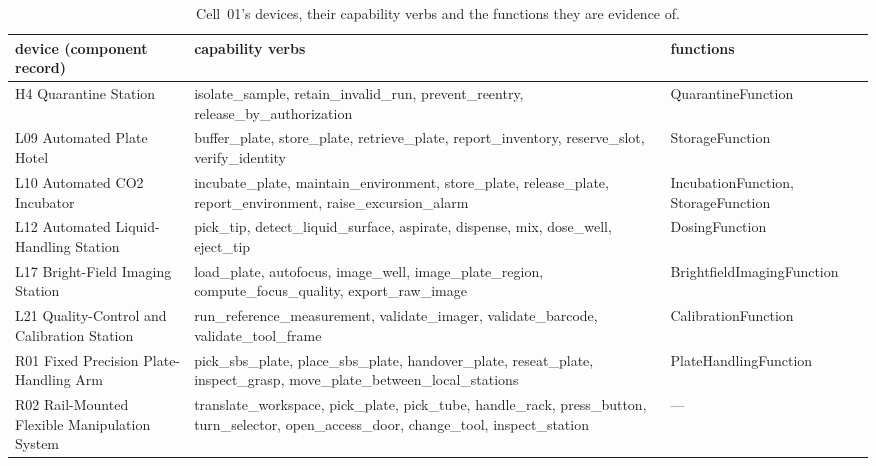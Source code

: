 \documentclass[10pt,a4paper]{article}
\begin{document}
\begin{table}[tbp]\centering\footnotesize
\caption{Cell~01's devices, their capability verbs and the functions they are evidence of.}\label{tab:c01dev}
\begin{tabularx}{\linewidth}{@{}>{\raggedright\arraybackslash}p{4.0cm}>{\raggedright\arraybackslash}X>{\raggedright\arraybackslash}p{3.6cm}@{}}\toprule device (component record) & capability verbs & functions \\ \midrule
H4 Quarantine Station & isolate\_\allowbreak{}sample, retain\_\allowbreak{}invalid\_\allowbreak{}run, prevent\_\allowbreak{}reentry, release\_\allowbreak{}by\_\allowbreak{}authorization & QuarantineFunction \\
L09 Automated Plate Hotel & buffer\_\allowbreak{}plate, store\_\allowbreak{}plate, retrieve\_\allowbreak{}plate, report\_\allowbreak{}inventory, reserve\_\allowbreak{}slot, verify\_\allowbreak{}identity & StorageFunction \\
L10 Automated CO2 Incubator & incubate\_\allowbreak{}plate, maintain\_\allowbreak{}environment, store\_\allowbreak{}plate, release\_\allowbreak{}plate, report\_\allowbreak{}environment, raise\_\allowbreak{}excursion\_\allowbreak{}alarm & IncubationFunction, StorageFunction \\
L12 Automated Liquid-Handling Station & pick\_\allowbreak{}tip, detect\_\allowbreak{}liquid\_\allowbreak{}surface, aspirate, dispense, mix, dose\_\allowbreak{}well, eject\_\allowbreak{}tip & DosingFunction \\
L17 Bright-Field Imaging Station & load\_\allowbreak{}plate, autofocus, image\_\allowbreak{}well, image\_\allowbreak{}plate\_\allowbreak{}region, compute\_\allowbreak{}focus\_\allowbreak{}quality, export\_\allowbreak{}raw\_\allowbreak{}image & BrightfieldImagingFunction \\
L21 Quality-Control and Calibration Station & run\_\allowbreak{}reference\_\allowbreak{}measurement, validate\_\allowbreak{}imager, validate\_\allowbreak{}barcode, validate\_\allowbreak{}tool\_\allowbreak{}frame & CalibrationFunction \\
R01 Fixed Precision Plate-Handling Arm & pick\_\allowbreak{}sbs\_\allowbreak{}plate, place\_\allowbreak{}sbs\_\allowbreak{}plate, handover\_\allowbreak{}plate, reseat\_\allowbreak{}plate, inspect\_\allowbreak{}grasp, move\_\allowbreak{}plate\_\allowbreak{}between\_\allowbreak{}local\_\allowbreak{}stations & PlateHandlingFunction \\
R02 Rail-Mounted Flexible Manipulation System & translate\_\allowbreak{}workspace, pick\_\allowbreak{}plate, pick\_\allowbreak{}tube, handle\_\allowbreak{}rack, press\_\allowbreak{}button, turn\_\allowbreak{}selector, open\_\allowbreak{}access\_\allowbreak{}door, change\_\allowbreak{}tool, inspect\_\allowbreak{}station & --- \\

\end{tabularx}
\end{table}
\end{document}

